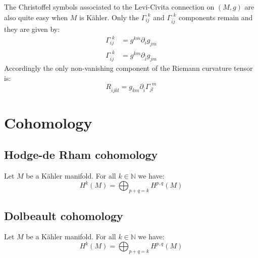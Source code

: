 	\begin{property}
		The Christoffel symbols associated to the Levi-Civita connection on $(M, g)$ are also quite easy when $M$ is K\"ahler. Only the $\Gamma^{\ \ k}_{ij}$ and $\Gamma^{\ \ \overline{k}}_{\overline{i}\overline{j}}$ components remain and they are given by:
		\begin{align}
			\Gamma^{\ \ k}_{ij} &= g^{k\overline{m}}\partial_ig_{j\overline{m}}\\
			\Gamma^{\ \ \overline{k}}_{\overline{i}\overline{j}} &= g^{\overline{k}m}\partial_{\overline{i}}g_{\overline{j}m}
		\end{align}
		Accordingly the only non-vanishing component of the Riemann curvature tensor is:
		\begin{equation}
			R_{\overline{i}j\overline{k}l} = g_{\overline{k}m}\partial_{\overline{i}}\Gamma^{\ \ m}_{jl}
		\end{equation}
	\end{property}
	
\section{Cohomology}
\subsection{Hodge-de Rham cohomology}


	\begin{theorem}
		Let $M$ be a K\"ahler manifold. For all $k\in\mathbb{N}$ we have:
		\begin{equation}
			H^k(M) = \bigoplus_{p+q=k}H^{p, q}(M)
		\end{equation}
	\end{theorem}

\subsection{Dolbeault cohomology}
	
	\begin{theorem}
		Let $M$ be a K\"ahler manifold. For all $k\in\mathbb{N}$ we have:
		\begin{equation}
			H^k(M) = \bigoplus_{p+q=k}H^{p, q}(M)
		\end{equation}
	\end{theorem}
	
